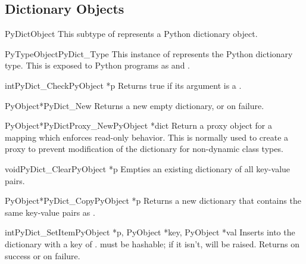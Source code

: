 

\subsection{Dictionary Objects \label{dictObjects}}

\begin{ctypedesc}{PyDictObject}
  This subtype of  represents a Python dictionary
  object.
\end{ctypedesc}

\begin{cvardesc}{PyTypeObject}{PyDict_Type}
  This instance of  represents the Python
  dictionary type.  This is exposed to Python programs as
   and .
\end{cvardesc}

\begin{cfuncdesc}{int}{PyDict_Check}{PyObject *p}
  Returns true if its argument is a .
\end{cfuncdesc}

\begin{cfuncdesc}{PyObject*}{PyDict_New}{}
  Returns a new empty dictionary, or \NULL{} on failure.
\end{cfuncdesc}

\begin{cfuncdesc}{PyObject*}{PyDictProxy_New}{PyObject *dict}
  Return a proxy object for a mapping which enforces read-only
  behavior.  This is normally used to create a proxy to prevent
  modification of the dictionary for non-dynamic class types.
\end{cfuncdesc}

\begin{cfuncdesc}{void}{PyDict_Clear}{PyObject *p}
  Empties an existing dictionary of all key-value pairs.
\end{cfuncdesc}

\begin{cfuncdesc}{PyObject*}{PyDict_Copy}{PyObject *p}
  Returns a new dictionary that contains the same key-value pairs as
  .
\end{cfuncdesc}

\begin{cfuncdesc}{int}{PyDict_SetItem}{PyObject *p, PyObject *key,
                                       PyObject *val}
  Inserts  into the dictionary  with a key of
  .   must be hashable; if it isn't,
   will be raised.
  Returns  on success or  on failure.
\end{cfuncdesc}

